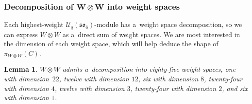 \documentclass[pdftex]{sigma}
\numberwithin{equation}{section}
\newtheorem{Lemma}[Theorem]{Lemma}
\theoremstyle{definition}
\begin{document}
\subsubsection[Decomposition of W tensor W into weight spaces]{Decomposition of $\boldsymbol{W \otimes W}$ into weight spaces}
Each highest-weight $\mathcal{U}_q(\mathfrak{so}_6)$-module has a~weight space decomposition, so we can express $W \otimes W$ as a~direct sum of weight spaces. We are most interested in the dimension of each weight space, which will help deduce the shape of $\pi_{W \otimes W}(C)$. \label{subsect-weightspacedecomp}

\begin{Lemma}\label{WeightSpaceLemma}
 $W \otimes W$ admits a~decomposition into eighty-five weight spaces, one with dimension~$22$, twelve with dimension $12$, six with dimension $8$, twenty-four with dimension $4$, twelve with dimension $3$, twenty-four with dimension $2$, and six with dimension $1$.
\end{Lemma}
\end{document}
